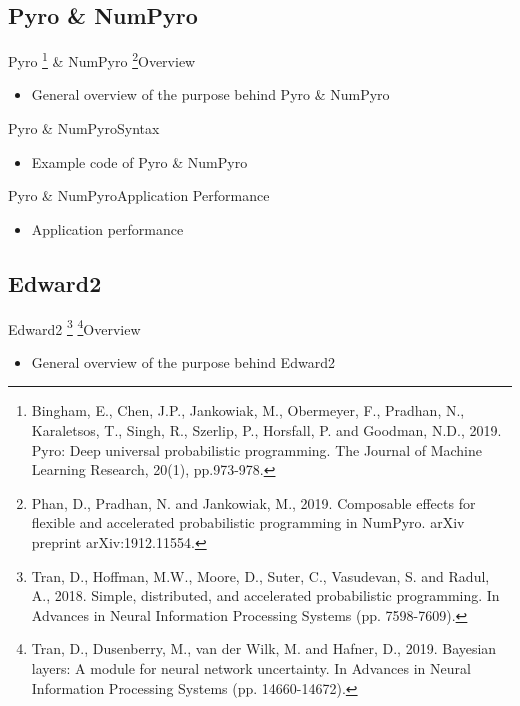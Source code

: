 \documentclass[AERbeamer%
              ,optEnglish%
              ,optBiber%
              ,optBibstyleAlphabetic%
              ,optBeamerClassicFormat%
              ]{AERlatex}%
\begin{document}
\subsection{Pyro \& NumPyro}
\begin{frame}[c]{Pyro \footnote{Bingham, E., Chen, J.P., Jankowiak, M., Obermeyer, F., Pradhan, N., Karaletsos, T.,
                                Singh, R., Szerlip, P., Horsfall, P. and Goodman, N.D., 2019. Pyro: Deep universal
                                probabilistic programming. The Journal of Machine Learning Research, 20(1), pp.973-978.}
                \& NumPyro \footnote{Phan, D., Pradhan, N. and Jankowiak, M., 2019. Composable effects for flexible and
                                     accelerated probabilistic programming in NumPyro. arXiv preprint arXiv:1912.11554.}}{Overview}
    \centering
    \begin{itemize}
        \item General overview of the purpose behind Pyro \& NumPyro
    \end{itemize}
\end{frame}


\begin{frame}[c]{Pyro \& NumPyro}{Syntax}
    \centering
    \begin{itemize}
        \item Example code of Pyro \& NumPyro
    \end{itemize}
\end{frame}


\begin{frame}[c]{Pyro \& NumPyro}{Application Performance}
    \centering
    \begin{itemize}
        \item Application performance
    \end{itemize}
\end{frame}


\subsection{Edward2}
\begin{frame}[c]{Edward2 \footnote{Tran, D., Hoffman, M.W., Moore, D., Suter, C., Vasudevan, S. and Radul, A., 2018. Simple, distributed,
                                   and accelerated probabilistic programming. In Advances in Neural Information Processing Systems (pp. 7598-7609).}
                         \footnote{Tran, D., Dusenberry, M., van der Wilk, M. and Hafner, D., 2019. Bayesian layers: A module for neural network
                                   uncertainty. In Advances in Neural Information Processing Systems (pp. 14660-14672).}}{Overview}
    \centering
    \begin{itemize}
        \item General overview of the purpose behind Edward2
    \end{itemize}
\end{frame}
\end{document}
